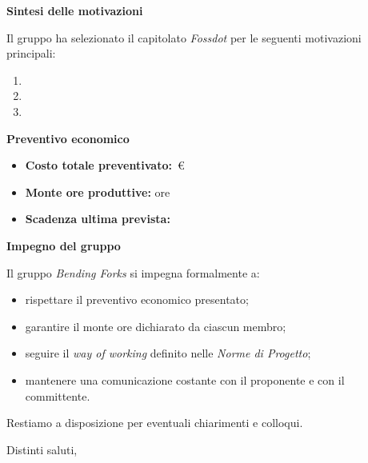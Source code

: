 \documentclass[11pt,a4paper]{article}
\begin{document}
{\color{bfblue}\bfseries Sintesi delle motivazioni}\par
Il gruppo ha selezionato il capitolato \emph{Fossdot} per le seguenti motivazioni principali:
\begin{enumerate}
\tightlist
\item {}
\item {}
\item {}
\end{enumerate}

{\color{bfblue}\bfseries Preventivo economico}\par
\begin{itemize}
\tightlist
\item \textbf{Costo totale preventivato:} \,€
\item \textbf{Monte ore produttive:}  ore
\item \textbf{Scadenza ultima prevista:} 
\end{itemize}

{\color{bfblue}\bfseries Impegno del gruppo}\par
Il gruppo \emph{Bending Forks} si impegna formalmente a:
\begin{itemize}
\tightlist
\item rispettare il preventivo economico presentato;
\item garantire il monte ore dichiarato da ciascun membro;
\item seguire il \emph{way of working} definito nelle \emph{Norme di Progetto};
\item mantenere una comunicazione costante con il proponente e con il committente.
\end{itemize}

Restiamo a disposizione per eventuali chiarimenti e colloqui.

Distinti saluti,

\vspace{1mm}
\end{document}
